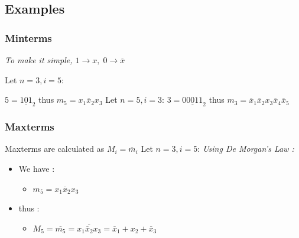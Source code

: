 \documentclass[12pt,openany, tikz,border=10pt]{book}
\begin{document}
			      	\vspace*{-10px}
			      	\subsection{Examples}
			      	\subsubsection*{Minterms}
			      	\textit{To make it simple, $1 \rightarrow x, \; 0 \rightarrow \overline{x} $} \newline
			      	
			      	Let $ n = 3, i = 5$:\newline
			      	
			      	$ 5 = \underline{101}_2$
			      	thus $m_5 = x_1 \overline{x}_2 x_3$ \newline
			      	Let $n=5, i=3$:\newline
			      	$ 3 = \underline{00011}_2$
			      	thus $m_3 = \overline{x}_1 \overline{x}_2 x_3 \overline{x}_4 \overline{x}_5$ \newline
			      	
			      	\newpage
			      	\subsubsection{Maxterms}
			      	Maxterms are calculated as $M_i = \overline{m}_i$ \newline
			      	Let $ n = 3, i = 5$:
			      	\newline \textit{Using De Morgan's Law :}
			      	\begin{itemize}
			      		\item[]We have :
			      		      \begin{itemize}
			      		      	\item[] $m_5 = x_1 \overline{x}_2 x_3$
			      		      \end{itemize}
			      		\item[]thus :
			      		      \begin{itemize}
			      		      	\item[] $M_5 = \overline{m_5} =  \overline{x_1 \overline{x}_2 x_3} = \overline{x}_1 + x_2 + \overline{x}_3$ \newline
			      		      \end{itemize}
			      	\end{itemize}
			      	
\end{document}
